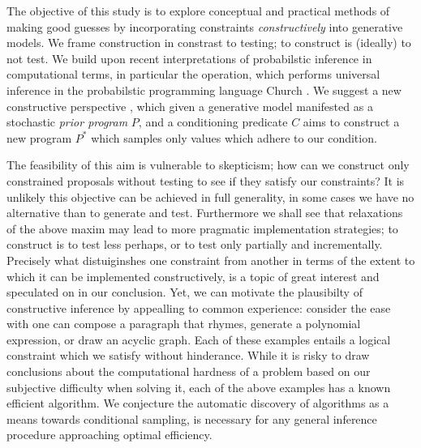 The objective of this study is to explore conceptual and practical methods of making good guesses by incorporating constraints \textit{constructively} into generative models.
We frame construction in constrast to testing; to construct is (ideally) to not test.
We build upon recent interpretations of probabilstic inference in computational terms, in particular the  operation, which performs universal inference in the probabilstic programming language Church \citep{church}.
We suggest a new constructive perspective , which given a generative model manifested as a stochastic {\em prior program} $P$, and a conditioning predicate $C$ aims to construct a new program $P^*$ which samples only values which adhere to our condition.

The feasibility of this aim is vulnerable to skepticism; how can we construct only constrained proposals without testing to see if they satisfy our constraints?
It is unlikely this objective can be achieved in full generality, in some cases we have no alternative than to generate and test.
Furthermore we shall see that relaxations of the above maxim may lead to more pragmatic implementation strategies; to construct is to test less perhaps, or to test only partially and incrementally.
Precisely what distuiginshes one constraint from another in terms of the extent to which it can be implemented constructively, is a topic of great interest and speculated on in our conclusion.
Yet, we can motivate the plausibilty of constructive inference by appealling to common experience:
consider the ease with one can compose a paragraph that rhymes, generate a polynomial expression, or draw an acyclic graph.
Each of these examples entails a logical constraint which we satisfy without hinderance.
While it is risky to draw conclusions about the computational hardness of a problem based on our subjective difficulty when solving it, each of the above examples has a known efficient algorithm.
We conjecture the automatic discovery of algorithms as a means towards conditional sampling, is necessary for any general inference procedure approaching optimal efficiency.



